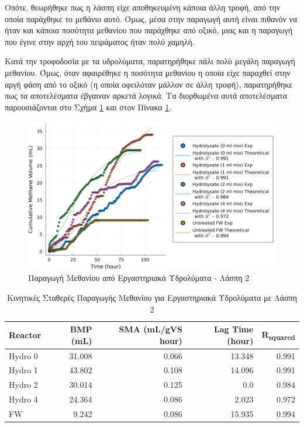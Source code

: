 \documentclass[11pt]{report}
\begin{document}
\begin{enumerate}
Οπότε, θεωρήθηκε πως η λάσπη είχε αποθηκευμένη κάποια άλλη τροφή, από την οποία παράχθηκε το μεθάνιο αυτό. Όμως, μέσα στην παραγωγή αυτή είναι πιθανόν να ήταν και κάποια ποσότητα μεθανίου που παράχθηκε από οξικό, μιας και η παραγωγή που έγινε στην αρχή του πειράματος ήταν πολύ χαμηλή.

Κατά την τροφοδοσία με τα υδρολύματα, παρατηρήθηκε πάλι πολύ μεγάλη παραγωγή μεθανίου. Όμως, όταν αφαιρέθηκε η ποσότητα μεθανίου η οποία είχε παραχθεί στην αργή φάση από το οξικό (η οποία οφειλόταν μάλλον σε άλλη τροφή), παρατηρήθηκε πως τα αποτελέσματα έβγαιναν αρκετά λογικά. Τα διορθωμένα αυτά αποτελέσματα παρουσιάζονται στο Σχήμα \ref{fig:org6e66b54} και στον Πίνακα \ref{tab:orgf1cb6fe}.

\begin{figure}[htbp]
\centering
\includegraphics[width=.9\linewidth]{../plots/BMPs/methane_s2_r1_comp.png}
\caption{\label{fig:org6e66b54}Παραγωγή Μεθανίου από Εργαστηριακά Υδρολύματα - Λάσπη 2}
\end{figure}

\begin{table}[htbp]
\caption{\label{tab:orgf1cb6fe}Κινητικές Σταθερές Παραγωγής Μεθανίου για Εργαστηριακά Υδρολύματα με Λάσπη 2}
\centering
\begin{tabular}{lrrrr}
Reactor & BMP (mL) & SMA (mL/gVS hour) & Lag Time (hour) & R\textsubscript{squared}\\[0pt]
\hline
Hydro 0 & 31.008 & 0.066 & 13.348 & 0.991\\[0pt]
Hydro 1 & 43.802 & 0.108 & 14.096 & 0.991\\[0pt]
Hydro 2 & 30.014 & 0.125 & 0.0 & 0.984\\[0pt]
Hydro 4 & 24.364 & 0.086 & 2.023 & 0.972\\[0pt]
FW & 9.242 & 0.086 & 15.935 & 0.994\\[0pt]
\end{tabular}
\end{table}


\end{enumerate}
\end{document}
